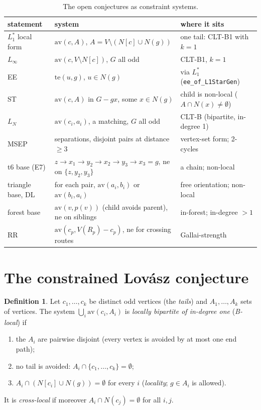 \documentclass[11pt]{amsart}
\theoremstyle{definition}
\newtheorem{definition}[theorem]{Definition}
\newcommand{\av}{\mathrm{av}}
\newcommand{\nev}{\mathrm{ne}}
\newcommand{\te}{\mathrm{te}}
\begin{document}
\begin{table}[t]\footnotesize
\begin{tabular}{@{}lll@{}}
\toprule
statement & system & where it sits\\
\midrule
$L_1^*$ local form \cite{L1S} & $\av(c,A)$, $A=V\setminus(N[c]\cup N(g))$ & one tail: CLT-B1 with $k=1$\\
$L_\infty$ & $\av(c,V\setminus N[c])$, $G$ all odd & CLT-B1, $k=1$\\
EE \cite{PE} & $\te(u,g)$, $u\in N(g)$ & via $L_1^*$ (\texttt{ee\_of\_L1StarGen})\\
ST \cite{L1I} & $\av(c,A)$ in $G-gx$, some $x\in N(g)$ & child is non-local ($A\cap N(x)\ne\emptyset$)\\
$L_N$ \cite{RD} & $\av(c_i,a_i)$, a matching, $G$ all odd & CLT-B (bipartite, in-degree 1)\\
MSEP \cite{MS} & separations, disjoint pairs at distance $\ge3$ & vertex-set form; 2-cycles\\
t6 base (E7) \cite{T6} & $z\to x_1\to y_2\to x_2\to y_3\to x_3{=}g$, $\nev$ on $\{z,y_2,y_3\}$ & a chain; non-local\\
triangle base, DL \cite{DT} & for each pair, $\av(a_i,b_i)$ or $\av(b_i,a_i)$ & free orientation; non-local\\
forest base \cite{DT} & $\av(v,p(v))$ (child avoids parent), $\nev$ on siblings & in-forest; in-degree $>1$\\
RR \cite{RD} & $\av(c_p,V(R_p)-c_p)$, $\nev$ for crossing routes & Gallai-strength\\
\bottomrule
\end{tabular}
\caption{The open conjectures as constraint systems.}\label{tab:targets}
\end{table}

\section{The constrained Lov\'asz conjecture}\label{sec:conj}

\begin{definition}\label{def:blocal}
Let $c_1,\dots,c_k$ be distinct odd vertices (the \emph{tails}) and $A_1,\dots,A_k$ sets of
vertices. The system $\bigcup_i\av(c_i,A_i)$ is \emph{locally bipartite of in-degree one}
(\emph{B-local}) if
\begin{enumerate}[label=(B\arabic*)]
\item\label{B1} the $A_i$ are pairwise disjoint (every vertex is avoided by at most one end path);
\item\label{B2} no tail is avoided: $A_i\cap\{c_1,\dots,c_k\}=\emptyset$;
\item\label{B3} $A_i\cap(N[c_i]\cup N(g))=\emptyset$ for every $i$ (\emph{locality}; $g\in A_i$ is
allowed).
\end{enumerate}
It is \emph{cross-local} if moreover $A_i\cap N(c_j)=\emptyset$ for all $i,j$.
\end{definition}
\end{document}
